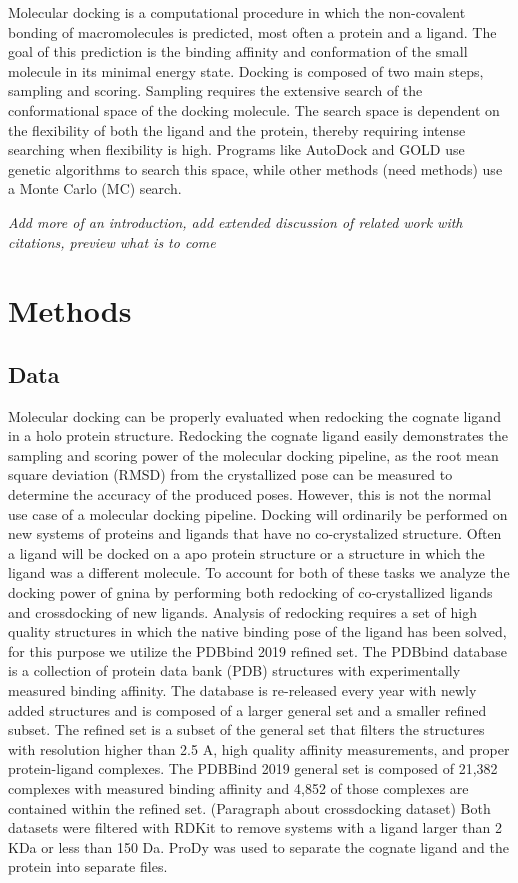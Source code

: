 \documentclass[journal=jcisd8,manuscript=article]{achemso}
\begin{document}
Molecular docking is a computational procedure in which the non-covalent bonding of macromolecules is predicted, most often a protein and a ligand. The goal of this prediction is the binding affinity and conformation of the small molecule in its minimal energy state. Docking is composed of two main steps, sampling and scoring. Sampling requires the extensive search of the conformational space of the docking molecule. The search space is dependent on the flexibility of both the ligand and the protein, thereby requiring intense searching when flexibility is high. Programs like AutoDock and GOLD use genetic algorithms to search this space, while other methods (need methods) use a Monte Carlo (MC) search.

\textit{Add more of an introduction, add extended discussion of related work with citations, preview what is to come}

\section{Methods}


\subsection{Data}
Molecular docking can be properly evaluated when redocking the cognate ligand in a holo protein structure. Redocking the cognate ligand easily demonstrates the sampling and scoring power of the molecular docking pipeline, as the root mean square deviation (RMSD) from the crystallized pose can be measured to determine the accuracy of the produced poses. However, this is not the normal use case of a molecular docking pipeline.  Docking will ordinarily be performed on new systems of proteins and ligands that have no co-crystalized structure. Often a ligand will be docked on a apo protein structure or a structure in which the ligand was a different molecule. To account for both of these tasks we analyze the docking power of gnina by performing both redocking of co-crystallized ligands and crossdocking of new ligands. 
Analysis of redocking requires a set of high quality structures in which the native binding pose of the ligand has been solved, for this purpose we utilize the PDBbind 2019 refined set. The PDBbind database is a collection of protein data bank (PDB) structures with experimentally measured binding affinity. The database is re-released every year with newly added structures and is composed of a larger general set and a smaller refined subset. The refined set is a subset of the general set that filters the structures with resolution higher than 2.5 A, high quality affinity measurements, and proper protein-ligand complexes.  The PDBBind 2019 general set is composed of 21,382 complexes with measured binding affinity and 4,852 of those complexes are contained within the refined set.
(Paragraph about crossdocking dataset)
Both datasets were filtered with RDKit to remove systems with a ligand larger than 2 KDa or less than 150 Da. ProDy was used to separate the cognate ligand and the protein into separate files.
\end{document}
